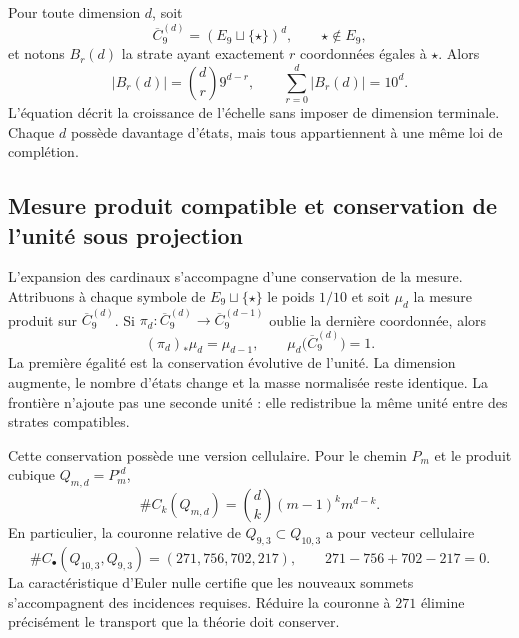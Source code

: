 Pour toute dimension \(d\), soit
\begin{equation}\label{p12-83-c0-s2:eq:amp-completacion-d}
 \overline C_9^{(d)}=(E_9\sqcup\{\star\})^d,
 \qquad \star\notin E_9,
\end{equation}
et notons \(B_r(d)\) la strate ayant exactement \(r\) coordonnées égales à
\(\star\). Alors
\begin{equation}\label{p12-83-c0-s2:eq:amp-estratos-binomial}
 |B_r(d)|=\binom dr9^{d-r},
 \qquad
 \sum_{r=0}^{d}|B_r(d)|=10^d.
\end{equation}
L'équation décrit la croissance de l'échelle sans imposer de dimension
terminale. Chaque \(d\) possède davantage d'états, mais tous appartiennent à une même loi
de complétion.

\subsection{Mesure produit compatible et conservation de l'unité sous projection}

L'expansion des cardinaux s'accompagne d'une conservation de la mesure. Attribuons
à chaque symbole de \(E_9\sqcup\{\star\}\) le poids \(1/10\) et soit \(\mu_d\) la
mesure produit sur \(\overline C_9^{(d)}\). Si
\(\pi_d:\overline C_9^{(d)}\to\overline C_9^{(d-1)}\) oublie la dernière
coordonnée, alors
\begin{equation}\label{p12-83-c0-s2:eq:amp-conservacion-proyectiva}
 (\pi_d)_*\mu_d=\mu_{d-1},
 \qquad
 \mu_d\bigl(\overline C_9^{(d)}\bigr)=1.
\end{equation}
La première égalité est la conservation évolutive de l'unité. La dimension
augmente, le nombre d'états change et la masse normalisée reste identique.
La frontière n'ajoute pas une seconde unité : elle redistribue la même unité entre
des strates compatibles.

Cette conservation possède une version cellulaire. Pour le chemin \(P_m\) et le
produit cubique \(Q_{m,d}=P_m^{\square d}\),
\begin{equation}\label{p12-83-c0-s2:eq:amp-celdas-cubicales}
 \#C_k(Q_{m,d})=\binom dk(m-1)^k m^{d-k}.
\end{equation}
En particulier, la couronne relative de \(Q_{9,3}\subset Q_{10,3}\) a pour
vecteur cellulaire
\begin{equation}\label{p12-83-c0-s2:eq:amp-corona-completa}
 \#C_\bullet(Q_{10,3},Q_{9,3})=(271,756,702,217),
 \qquad 271-756+702-217=0.
\end{equation}
La caractéristique d'Euler nulle certifie que les nouveaux sommets
s'accompagnent des incidences requises. Réduire la couronne à \(271\) élimine
précisément le transport que la théorie doit conserver.

